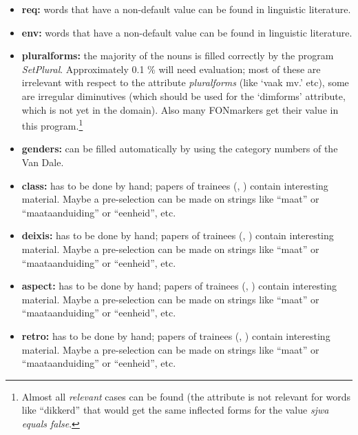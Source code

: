 \begin{itemize}
  \item {\bf req:} words that have a non-default value can be found in 
        linguistic literature.
 
  \item {\bf env:} words that have a non-default value can be found in 
        linguistic literature.
 
  \item {\bf pluralforms:} the majority of the nouns is filled correctly by the 
        program {\em SetPlural}. Approximately 0.1 \% will need evaluation; 
        most of these are irrelevant with respect to the attribute {\em 
        pluralforms} (like `vaak mv.' etc), some are irregular diminutives 
        (which should be used for the `dimforms' attribute, which is not yet 
        in the domain). Also many FONmarkers get their value in this 
        program.\footnote{Almost all {\em relevant} cases can be found (the 
        attribute is not relevant for words like ``dikkerd'' that would get the 
        same inflected forms for the value {\em sjwa equals false}.}
 
  \item {\bf genders:} can be filled automatically by using the category 
        numbers of the Van Dale.
 
  \item {\bf class:} has to be done by hand; papers of trainees (\cite{po:tp},
        \cite{ko:ta}) contain interesting material.
        Maybe a pre-selection can be made on strings like ``maat'' or 
        ``maataanduiding'' or ``eenheid'', etc.
 
  \item {\bf deixis:} has to be done by hand; papers of trainees (\cite{po:tp},
        \cite{ko:ta}) contain interesting material.
        Maybe a pre-selection can be made on strings like ``maat'' or 
        ``maataanduiding'' or ``eenheid'', etc.
 
  \item {\bf aspect:} has to be done by hand; papers of trainees (\cite{po:tp},
        \cite{ko:ta}) contain interesting material.
        Maybe a pre-selection can be made on strings like ``maat'' or 
        ``maataanduiding'' or ``eenheid'', etc.
 
  \item {\bf retro:} has to be done by hand; papers of trainees (\cite{po:tp},
        \cite{ko:ta}) contain interesting material.
        Maybe a pre-selection can be made on strings like ``maat'' or 
        ``maataanduiding'' or ``eenheid'', etc.
 

\end{itemize}
